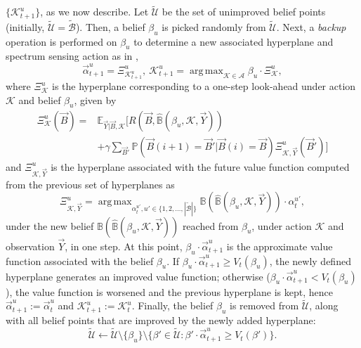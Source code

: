 \documentclass[10pt,twocolumn]{IEEEtran}
\DeclareMathOperator*{\argmax}{arg\,max}
\begin{document}
$\{\mathcal K_{t+1}^{u}\}$, as we now describe. Let $\tilde{\mathcal{U}}$ be the set of unimproved belief points (initially, $\tilde{\mathcal{U}}{=}\tilde{\mathcal{B}}$). Then, a belief $\beta_u$ is picked randomly from $\tilde{\mathcal{U}}$. Next, a \emph{backup} operation is performed on $\beta_u$ to determine a new associated hyperplane and spectrum sensing action as in \cite{DBLP:journals/corr/abs-1109-2145},
\begin{equation}\label{20}
    \vec{\alpha}_{t+1}^{u}=\Xi_{\mathcal K_{t+1}^{u}}^{u},\ 
    \mathcal K_{t+1}^{u}=\argmax_{\mathcal{K} \in \mathcal{A}} \beta_u \cdot \Xi_{\mathcal{K}}^{u},
\end{equation}
where $\Xi_{\mathcal{K}}^{u}$ is the hyperplane corresponding to a one-step look-ahead under action $\mathcal K$ and belief $\beta_u$, given by
\begin{align*}
\nonumber
    \Xi_{\mathcal{K}}^{u}(\vec{B}) = &\mathbb{E}_{\vec{Y}|\vec{B}, \mathcal{K}} \Big[R(\vec{B}, \hat{\mathbb{B}}(\beta_{u}, \mathcal{K}, \vec{Y}))\\&+\gamma \sum_{\vec{B}'}\mathbb{P}(\vec{B}(i+1){=} \vec{B}'|\vec{B}(i){=}\vec{B}) \Xi_{\mathcal{K}, \vec{Y}}^{u}(\vec{B}')\Big]
\end{align*}
and $\Xi_{\mathcal{K}, \vec{Y}}^{u}$ is the hyperplane associated with the future value function computed from the previous set of hyperplanes as
\begin{equation}
\nonumber
    \Xi_{\mathcal{K}, \vec{Y}}^{u}=\argmax_{\alpha_{t}^{u'}, u' {\in} \{1, 2, \dots, |\tilde{\mathcal{B}}|\}} \mathbb{B}(\hat{\mathbb{B}}(\beta_{u}, \mathcal{K}, \vec{Y}))\cdot\alpha_{t}^{u'},
\end{equation}
under the new belief $\mathbb{B}(\hat{\mathbb{B}}(\beta_{u}, \mathcal{K}, \vec{Y}))$ reached from $\beta_{u}$, under action $\mathcal{K}$ and observation $\vec{Y}$, in one step. At this point, $\beta_{u}{\cdot}\vec{\alpha}_{t+1}^{u}$ is the approximate value function associated with the belief $\beta_u$. If $\beta_{u}{\cdot}\vec{\alpha}_{t+1}^{u}{\geq}V_{t}(\beta_{u})$, the newly defined hyperplane generates an improved value function; otherwise ($\beta_{u}{\cdot}\vec{\alpha}_{t+1}^{u}{<}V_{t}(\beta_{u})$), the value function is worsened and the previous hyperplane is kept, hence $\vec{\alpha}_{t+1}^{u}{:=}\vec{\alpha}_{t}^{u}$ and $\mathcal K_{t+1}^{u}{:=}\mathcal K_{t}^{u}$. Finally, the belief $\beta_u$ is removed from $\tilde{\mathcal{U}}$, along with all belief points that are improved by the newly added hyperplane:
$$
\tilde{\mathcal{U}}\leftarrow \tilde{\mathcal{U}}\setminus\{\beta_u\}\setminus
\{\beta'\in\tilde{\mathcal{U}}:\beta'{\cdot}\vec{\alpha}_{t+1}^{u}\geq V_t(\beta')\}.
$$
\end{document}
